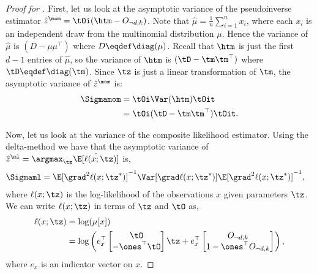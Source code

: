 \begin{proof}[Proof for ]
  First, let us look at the
  asymptotic variance of the pseudoinverse estimator
  $\hat{z}^\mom = \tOi (\htm - O_{\neg d,k})$. 
  Note that $\hat\mu = \frac1n\sum_{i=1}^n x_i$, where each $x_i$ is an independent draw from the multinomial distribution $\mu$.
  Hence the variance of
    $\hat\mu$ is $(D - \mu\mu^\top)$ where $D \eqdef \diag(\mu)$.
  Recall that $\htm$ is just the first $d-1$ entries of $\hat\mu$, so
  the variance of
    $\htm$ is $(\tD - \tm \tm^\top)$ where $\tD \eqdef \diag(\tm)$.
  Since $\tz$ is just a linear transformation of $\tm$,
  the asymptotic variance of $\hat{z}^\mom$ is:
  \begin{align*}
      \Sigmamom &= \tOi \Var(\htm) \tOit \\
      &= \tOi (\tD - \tm \tm^\top) \tOit.
  \end{align*}
  
  Now, let us look at the variance of the composite likelihood estimator.  Using
  the delta-method \cite{vaart98asymptotic} we have that the asymptotic
  variance of 
  $\hat{z}^\ml = \argmax_{\tz} \hat\E[\ell(x ; \tz)]$ is,
  \begin{align*}
    \Sigmaml &= \E[\grad^2 \ell(x ; \tz^*)]^{-1} \Var[\grad \ell(x ; \tz^*)] \E[\grad^2 \ell(x ; \tz^*)]^{-1},
  \end{align*}
  where $\ell(x;\tz)$ is the log-likelihood of the observations $x$
  given parameters $\tz$. We can write $\ell(x;\tz)$ in terms of $\tz$
  and $\tO$ as,
  \begin{align*}
    \ell(x;\tz) 
              &= \log( \mu[x] ) \\
              &= \log \left( 
    e_x^\top \begin{bmatrix}
      \tO \\
      - \ones^\top\tO
    \end{bmatrix} \tz 
    + 
    e_x^\top \begin{bmatrix}
      O_{\neg d, k} \\
      1 - \ones^\top O_{\neg d, k}
    \end{bmatrix}
    \right),
  \end{align*}
where $e_x$ is an indicator vector on $x$.


\end{proof}
